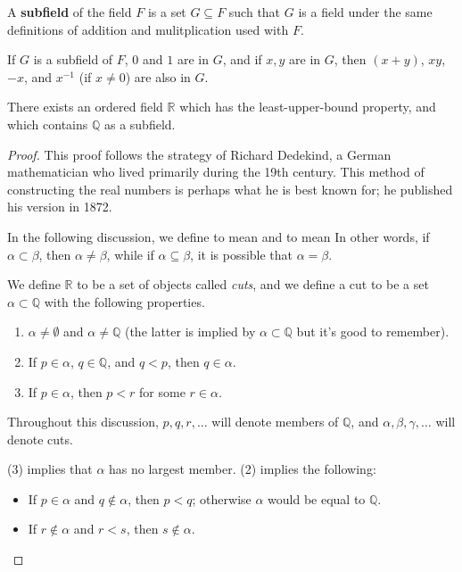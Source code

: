 \documentclass[12pt]{article}
\begin{document}
\begin{defn}
  A \textbf{subfield} of the field $F$ is a set $G \subseteq F$
  such that $G$ is a field under the same definitions of addition
  and mulitplication used with $F$.
\end{defn}

\begin{comm}
  If $G$ is a subfield of $F$, $0$ and $1$ are in $G$, and if $x,
  y$ are in $G$, then $(x + y)$, $xy$, $-x$, and $x^{-1}$ (if
  $x \neq 0$) are also in $G$.
\end{comm}

\begin{thm} \label{thm:rlubsubq}
  There exists an ordered field $\mathbb{R}$ which has the least-upper-bound
  property, and which contains $\mathbb{Q}$ as a subfield.

  \begin{proof}
    This proof follows the strategy of Richard Dedekind, a German mathematician who
    lived primarily during the 19th century. This method of constructing the real
    numbers is perhaps what he is best known for; he published his version in 1872.

    In the following discussion, we define \say{$\subset$} to mean  and \say{$\subseteq$} to mean  In other words,
    if $\alpha \subset \beta$, then $\alpha \neq \beta$, while if $\alpha \subseteq
    \beta$, it is possible that $\alpha = \beta$.

    We define $\mathbb{R}$ to be a set of objects called \textit{cuts}, and we define
    a cut to be a set $\alpha \subset \mathbb{Q}$ with the following properties.
    \begin{enumerate}
      \item
        $\alpha \neq \emptyset$ and $\alpha \neq \mathbb{Q}$ (the latter is implied
        by $\alpha \subset \mathbb{Q}$ but it's good to remember).
      \item
        If $p \in \alpha$, $q \in \mathbb{Q}$, and $q < p$, then $q \in \alpha$.
      \item
        If $p \in \alpha$, then $p < r$ for some $r \in \alpha$.
    \end{enumerate}

    Throughout this discussion, $p,q,r,\ldots$ will denote members of $\mathbb{Q}$,
    and $\alpha,\beta,\gamma,\ldots$ will denote cuts.

    (3) implies that $\alpha$ has no largest member. (2) implies the following:
    \begin{itemize}
      \item
        If $p \in \alpha$ and $q \notin \alpha$, then $p < q$; otherwise $\alpha$
        would be equal to $\mathbb{Q}$.
      \item
        If $r \notin \alpha$ and $r < s$, then $s \notin \alpha$.
    \end{itemize}


\end{proof}
\end{thm}
\end{document}
